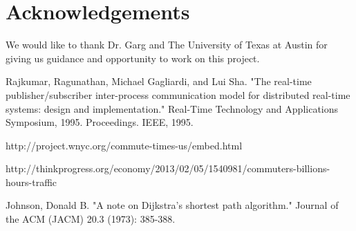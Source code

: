 \documentclass[conference]{IEEEtran}
\begin{document}
\section{Acknowledgements}

We would like to thank Dr. Garg and The University of Texas at Austin for giving us guidance and opportunity to work on this project.

\begin{thebibliography}{1}

Rajkumar, Ragunathan, Michael Gagliardi, and Lui Sha. "The real-time publisher/subscriber inter-process communication model for distributed real-time systems: design and implementation." Real-Time Technology and Applications Symposium, 1995. Proceedings. IEEE, 1995.

http://project.wnyc.org/commute-times-us/embed.html

http://thinkprogress.org/economy/2013/02/05/1540981/commuters-billions-hours-traffic

Johnson, Donald B. "A note on Dijkstra's shortest path algorithm." Journal of the ACM (JACM) 20.3 (1973): 385-388.

\end{thebibliography}
\end{document}
